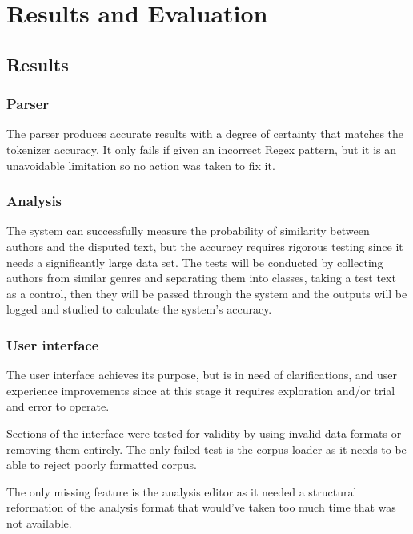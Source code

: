 \chapter{Results and Evaluation}

\section{Results}
\subsection{Parser}
The parser produces accurate results with a degree of certainty that matches the tokenizer accuracy. It only fails if given an incorrect Regex pattern, but it is an unavoidable limitation so no action was taken to fix it.

\subsection{Analysis}
The system can successfully measure the probability of similarity between authors and the disputed text, but the accuracy requires rigorous testing since it needs a significantly large data set. The tests will be conducted by collecting authors from similar genres and separating them into classes, taking a test text as a control, then they will be passed through the system and the outputs will be logged and studied to calculate the system's accuracy.

\subsection{User interface}
The user interface achieves its purpose, but is in need of clarifications, and user experience improvements since at this stage it requires exploration and/or trial and error to operate.

Sections of the interface were tested for validity by using invalid data formats or removing them entirely. The only failed test is the corpus loader as it needs to be able to reject poorly formatted corpus.

The only missing feature is the analysis editor as it needed a structural reformation of the analysis format that would've taken too much time that was not available.

